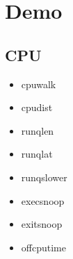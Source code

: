 \documentclass{beamer}
\begin{document}
\begin{frame}
  \begin{figure}
    \centering
    \noindent{}
  \end{figure}
\end{frame}


\section{Demo}

\subsection{CPU}
\begin{frame}
	\begin{itemize}
		\item<+-> cpuwalk
		\item<+-> cpudist
		\item<+-> runqlen
		\item<+-> runqlat
		\item<+-> runqslower
		\item<+-> execsnoop
		\item<+-> exitsnoop
		\item<+-> offcputime
	\end{itemize}
\end{frame}
\end{document}
